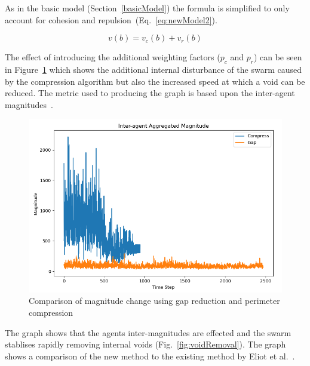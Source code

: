 \documentclass[12pt,a4paper]{IEEEtran}
\begin{document}
As in the basic model (Section~\ref{basicModel}) the formula is simplified to only account for cohesion and repulsion~(Eq.~\ref{eq:newModel2}).

\begin{equation}\label{eq:newModel2}
v(b) = v_c(b) + v_r(b)
\end{equation}

The effect of introducing the additional weighting factors ($p_c$ and $p_r$) can be seen in Figure~\ref{fig:compressioneffect1} which shows the additional internal disturbance of the swarm caused by the compression algorithm but also the increased speed at which a void can be reduced. The metric used to producing the graph is based upon the inter-agent magnitudes~\cite{eliot2018metric}. 

\begin{figure}[H]
	\centering
	\includegraphics[width=0.8\linewidth]{figures/CompressionEffect1}
	\caption[Compression Effect]{Comparison of magnitude change using gap reduction and perimeter compression}
	\label{fig:compressioneffect1}
\end{figure}

The graph shows that the agents inter-magnitudes are effected and the swarm stablises rapidly removing internal voids (Fig.~\ref{fig:voidRemoval}). The graph shows a comparison of the new method to the existing method by Eliot et al.~\cite{eliot2019void}.
\end{document}
